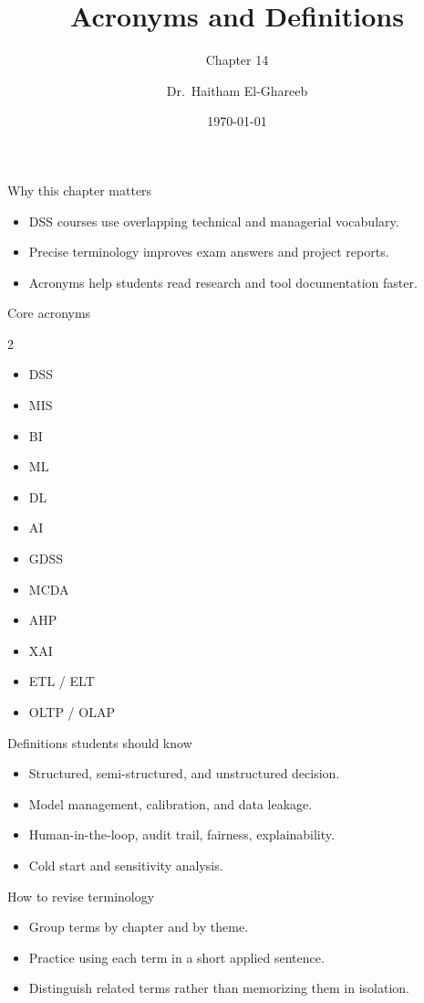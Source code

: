 \documentclass[aspectratio=169,11pt]{beamer}
\title[Acronyms and Terms]{Acronyms and Definitions}
\subtitle{Chapter 14}
\author{Dr.\ Haitham El-Ghareeb}
\institute{Faculty of Computers and Information Sciences}
\date{\today}
\begin{document}
\begin{frame}
  \titlepage
\end{frame}

\begin{frame}{Why this chapter matters}
  \begin{itemize}
    \item DSS courses use overlapping technical and managerial vocabulary.
    \item Precise terminology improves exam answers and project reports.
    \item Acronyms help students read research and tool documentation faster.
  \end{itemize}
\end{frame}

\begin{frame}{Core acronyms}
  \begin{multicols}{2}
    \begin{itemize}
      \item DSS
      \item MIS
      \item BI
      \item ML
      \item DL
      \item AI
      \item GDSS
      \item MCDA
      \item AHP
      \item XAI
      \item ETL / ELT
      \item OLTP / OLAP
    \end{itemize}
  \end{multicols}
\end{frame}

\begin{frame}{Definitions students should know}
  \begin{itemize}
    \item Structured, semi-structured, and unstructured decision.
    \item Model management, calibration, and data leakage.
    \item Human-in-the-loop, audit trail, fairness, explainability.
    \item Cold start and sensitivity analysis.
  \end{itemize}
\end{frame}

\begin{frame}{How to revise terminology}
  \begin{itemize}
    \item Group terms by chapter and by theme.
    \item Practice using each term in a short applied sentence.
    \item Distinguish related terms rather than memorizing them in isolation.
  \end{itemize}
\end{frame}
\end{document}
